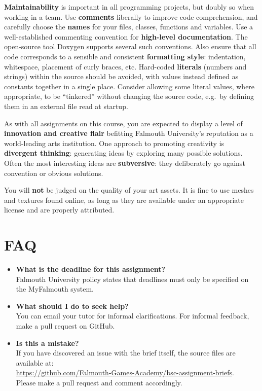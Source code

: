 \documentclass{../../fal_assignment}
\begin{document}
\textbf{Maintainability} is important in all programming projects,
but doubly so when working in a team.
Use \textbf{comments} liberally to improve code comprehension,
and carefully choose the \textbf{names} for your files, classes, functions and variables.
Use a well-established commenting convention
for \textbf{high-level documentation}.
The open-source tool Doxygen supports several such conventions.
Also ensure that all code corresponds to a sensible and consistent \textbf{formatting style}:
indentation, whitespace, placement of curly braces, etc.
Hard-coded \textbf{literals} (numbers and strings) within the source should be avoided,
with values instead defined as constants together in a single place.
Consider allowing some literal values, where appropriate, to be ``tinkered'' without changing the source code,
e.g.\ by defining them in an external file read at startup.

As with all assignments on this course, you are expected to display a level of
\textbf{innovation and creative flair} befitting Falmouth University's reputation as a world-leading
arts institution.
One approach to promoting creativity is
\textbf{divergent thinking}: generating ideas by exploring many possible solutions.
Often the most interesting ideas are \textbf{subversive}: they deliberately go against
convention or obvious solutions.

You will \textbf{not} be judged on the quality of your art assets.
It is fine to use meshes and textures found online,
as long as they are available under an appropriate license and are properly attributed.

\section*{FAQ}

\begin{itemize}
	\item 	\textbf{What is the deadline for this assignment?} \\ 
    		Falmouth University policy states that deadlines must only be specified on the MyFalmouth system.
    		
	\item 	\textbf{What should I do to seek help?} \\ 
    		You can email your tutor for informal clarifications. For informal feedback, make a pull request on GitHub. 
    		
    	\item 	\textbf{Is this a mistake?} \\ 	
    		If you have discovered an issue with the brief itself, the source files are available at: \\
    		\url{https://github.com/Falmouth-Games-Academy/bsc-assignment-briefs}.\\
    		 Please make a pull request and comment accordingly.
\end{itemize}
\end{document}
